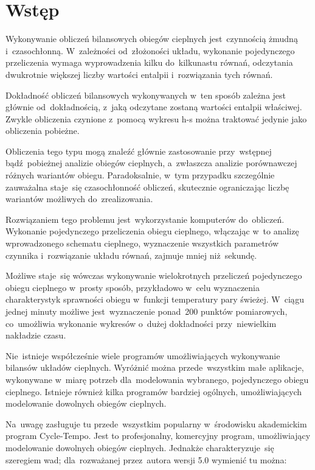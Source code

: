 \section{Wstęp}

Wykonywanie obliczeń bilansowych obiegów cieplnych jest~czynnością
żmudną i~czasochłonną. W~zależności od~złożoności układu, wykonanie
pojedynczego przeliczenia wymaga wyprowadzenia kilku do~kilkunastu
równań, odczytania dwukrotnie większej liczby wartości entalpii
i~rozwiązania tych równań.

Dokładność obliczeń bilansowych wykonywanych w~ten sposób zależna jest
głównie od~dokładnością, z~jaką odczytane zostaną wartości entalpii
właściwej. Zwykle obliczenia czynione z~pomocą wykresu h-s można
traktować jedynie jako obliczenia pobieżne.

Obliczenia tego typu mogą znaleźć głównie zastosowanie przy~wstępnej
bądź~pobieżnej analizie obiegów cieplnych, a~zwłaszcza analizie
porównawczej różnych wariantów obiegu. Paradoksalnie, w~tym przypadku
szczególnie zauważalna staje~się czasochłonność obliczeń, skutecznie
ograniczając liczbę wariantów możliwych do~zrealizowania.

Rozwiązaniem tego problemu jest~wykorzystanie komputerów do~obliczeń.
Wykonanie pojedynczego przeliczenia obiegu cieplnego, włączając w~to
analizę wprowadzonego schematu cieplnego, wyznaczenie wszystkich
parametrów czynnika i~rozwiązanie układu równań, zajmuje mniej
niż~sekundę.

Możliwe staje~się wówczas wykonywanie wielokrotnych przeliczeń
pojedynczego obiegu cieplnego w~prosty sposób, przykładowo w~celu
wyznaczenia charakterystyk sprawności obiegu w~funkcji temperatury pary
świeżej. W~ciągu jednej minuty możliwe jest~wyznaczenie ponad~200
punktów pomiarowych, co~umożliwia wykonanie wykresów o~dużej dokładności
przy~niewielkim nakładzie czasu.

Nie~istnieje współcześnie wiele programów umożliwiających wykonywanie
bilansów układów cieplnych. Wyróżnić można przede~wszystkim małe
aplikacje, wykonywane w~miarę potrzeb dla~modelowania wybranego,
pojedynczego obiegu cieplnego. Istnieje również kilka programów bardziej
ogólnych, umożliwiających modelowanie dowolnych obiegów cieplnych.

Na~uwagę zasługuje tu przede~wszystkim popularny w~środowisku
akademickim program Cycle-Tempo. Jest to profesjonalny, komercyjny
program, umożliwiający modelowanie dowolnych obiegów cieplnych. Jednakże
charakteryzuje~się szeregiem wad; dla~rozważanej przez~autora wersji 5.0
wymienić tu można:

